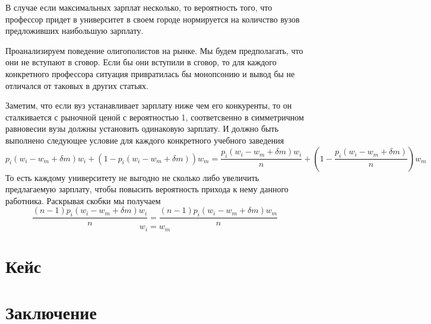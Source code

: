 \documentclass[a4paper, 12pt]{article}
\theoremstyle{definition}
\theoremstyle{plain}
\begin{document}
В случае если максимальных зарплат несколько, то вероятность того, что профессор придет в университет в своем городе нормируется на количство вузов предложивших наибольшую зарплату. 

Проанализируем поведение олигополистов на рынке. Мы будем предполагать, что они не вступают в сговор. Если бы они вступили в сговор, то для каждого конкретного профессора ситуация привратилась бы монопсонию и вывод бы не отличался от таковых в других  статьях. 

Заметим, что если вуз устанавливает зарплату ниже чем его конкуренты, то он сталкивается с рыночной ценой с вероятностью 1, соответсвенно в симметричном равновесии  вузы должны установить одинаковую зарплату. И должно быть выполнено следующее условие для каждого конкретного учебного заведения
\[
p_i(w_i - w_m + \delta m) w_i + (1 - p_i(w_i - w_m + \delta m))w_m = \frac{p_i(w_i - w_m + \delta m) w_i}{n} + (1 -\frac{ p_i(w_i - w_m + \delta m)}{n})w_m
\]
То есть каждому университету не выгодно не сколько либо увеличить предлагаемую зарплату, чтобы повысить вероятность прихода к нему данного работника. Раскрывая скобки мы получаем 
\[
\frac{(n-1)p_i(w_i - w_m + \delta m) w_i}{n} = \frac{(n-1) p_i(w_i - w_m + \delta m) w_m}{n}
\]
\[
w_i = w_m
\]



\section{Кейс}

\section{Заключение}
\end{document}
